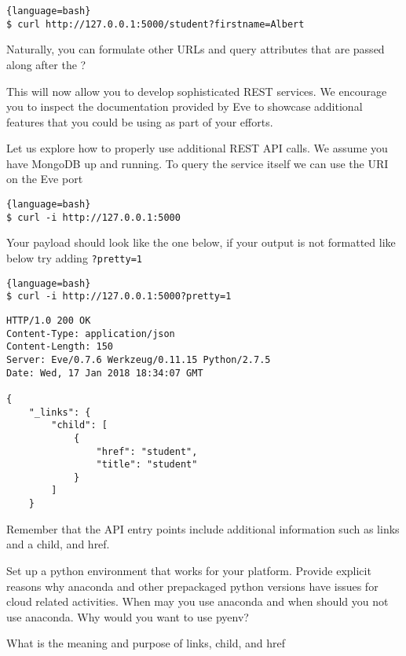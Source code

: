 \begin{lstlisting}{language=bash}
$ curl http://127.0.0.1:5000/student?firstname=Albert
\end{lstlisting}

Naturally, you can formulate other URLs and query attributes that are
passed along after the ? 

This will now allow you to develop sophisticated REST services. We
encourage you to inspect the documentation provided by Eve to showcase
additional features that you could be using as part of your efforts.

Let us explore how to properly use additional REST API calls. We
assume you have MongoDB up and running. To query the service itself we
can use the URI on the Eve port


\begin{lstlisting}{language=bash}
$ curl -i http://127.0.0.1:5000
\end{lstlisting}

Your payload should look like the one below, if your output is not
formatted like below try adding \verb|?pretty=1|

\begin{lstlisting}{language=bash}
$ curl -i http://127.0.0.1:5000?pretty=1
\end{lstlisting}

\begin{lstlisting}
HTTP/1.0 200 OK
Content-Type: application/json
Content-Length: 150
Server: Eve/0.7.6 Werkzeug/0.11.15 Python/2.7.5
Date: Wed, 17 Jan 2018 18:34:07 GMT

{
    "_links": {
        "child": [
            {
                "href": "student",
                "title": "student"
            }
        ]
    }
\end{lstlisting}

Remember that the API entry points include additional information such
as links and a child, and href.



\begin{exercise}
Set up a python environment that works for your platform. Provide
explicit reasons why anaconda and other prepackaged python versions
have issues for cloud related activities. When may you use anaconda
and when should you not use anaconda. Why would you want to use pyenv?
\end{exercise}

\begin{exercise}
What is the meaning and purpose of links, child, and href
\end{exercise}

